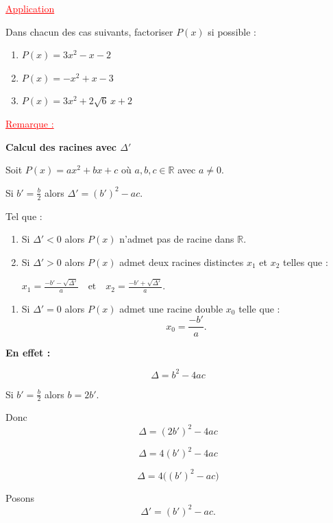 \documentclass[12pt,a4paper]{article}
\begin{document}
\textcolor{red}{\underline{Application}}

Dans chacun des cas suivants, factoriser $P(x)$ si possible :

\begin{enumerate}
\item $P(x)=3x^2-x-2$
\item $P(x)=-x^2+x-3$
\item $P(x)=3x^2+2\sqrt{6}\,x+2$
\end{enumerate}

\noindent
\textcolor{red}{\underline{Remarque :}}

\medskip

\textbf{Calcul des racines avec $\Delta'$}

\medskip

Soit 
\(
P(x)=ax^2+bx+c
\)
où $a,b,c\in\mathbb{R}$ avec $a\neq0$.

Si 
\(
b'=\frac{b}{2}
\)
alors
\(
\Delta'=(b')^2-ac.
\)

\medskip

Tel que :

\begin{enumerate}

\item[(i)] Si $\Delta'<0$ alors $P(x)$ n’admet pas de racine dans $\mathbb{R}$.

\item[(ii)] Si $\Delta'>0$ alors $P(x)$ admet deux racines distinctes $x_1$ et $x_2$ telles que :

\(
x_1=\frac{-b'-\sqrt{\Delta'}}{a}
\quad \text{et} \quad
x_2=\frac{-b'+\sqrt{\Delta'}}{a}.
\)

\end{enumerate}

\begin{enumerate}
\item[(iii)] Si $\Delta'=0$ alors $P(x)$ admet une racine double $x_0$ telle que :
\[
x_0=\frac{-b'}{a}.
\]
\end{enumerate}

\medskip

\textbf{En effet :}

\[
\Delta=b^2-4ac
\]

Si $b'=\frac{b}{2}$ alors $b=2b'$.

Donc
\[
\Delta=(2b')^2-4ac
\]

\[
\Delta=4(b')^2-4ac
\]

\[
\Delta=4\big((b')^2-ac\big)
\]

Posons
\[
\Delta'=(b')^2-ac.
\]
\end{document}
